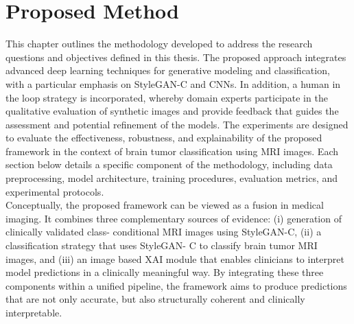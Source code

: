 


\chapter{Proposed Method}

This chapter outlines the methodology developed to address the research questions and objectives defined in this thesis. The proposed approach integrates advanced deep learning techniques for generative modeling and classification, with a particular emphasis on StyleGAN-C and CNNs. In addition, a human in the loop strategy is incorporated, whereby domain experts participate in the qualitative evaluation of synthetic images and provide feedback that guides the assessment and potential refinement of the models. The experiments are designed to evaluate the effectiveness, robustness, and explainability of the proposed framework in the context of brain tumor classification using MRI images. Each section below details a specific component of the methodology, including data preprocessing, model architecture, training procedures, evaluation metrics, and experimental protocols.\\

Conceptually, the proposed framework can be viewed as a fusion in medical imaging. It combines three complementary sources of evidence: (i) generation of clinically validated class-
conditional MRI images using StyleGAN-C, (ii) a classification strategy that uses StyleGAN-
C to classify brain tumor MRI images, and (iii) an image based XAI module that enables
clinicians to interpret model predictions in a clinically meaningful way. By integrating these three components within a unified pipeline, the framework aims to produce predictions that are not only accurate, but also structurally coherent and clinically interpretable.




